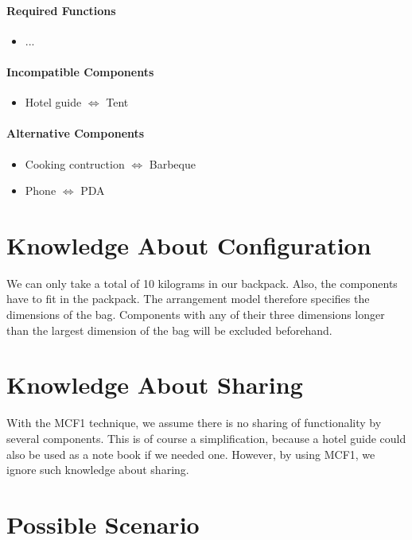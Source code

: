 \documentclass[a4paper,11pt]{article}
\begin{document}
\paragraph{Required Functions}

\begin{itemize}
\item ...
\end{itemize}

\paragraph{Incompatible Components}

\begin{itemize}
\item Hotel guide $\Leftrightarrow$ Tent
\end{itemize}

\paragraph{Alternative Components}

\begin{itemize}
\item Cooking contruction $\Leftrightarrow$ Barbeque
\item Phone $\Leftrightarrow$ PDA
\end{itemize}


\section*{Knowledge About Configuration}

We can only take a total of 10 kilograms in our backpack.
Also, the components have to fit in the packpack.
The arrangement model therefore specifies the dimensions of the bag. 
Components with any of their three dimensions longer than the largest dimension 
of the bag will be excluded beforehand.


\section*{Knowledge About Sharing}

With the MCF1 technique, we assume there is no sharing of functionality by
several components. This is of course a simplification, because a hotel guide
could also be used as a note book if we needed one. However, by using MCF1, we
ignore such knowledge about sharing.


\section*{Possible Scenario}
\end{document}
